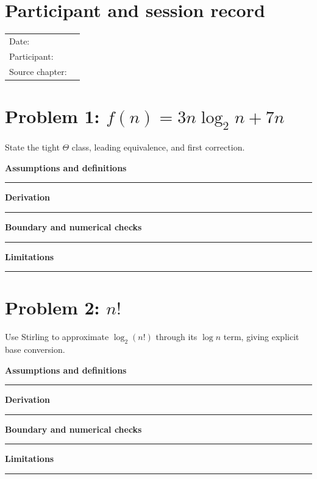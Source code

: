 \documentclass[11pt]{article}
\begin{document}
\makedoctitle
\section{Participant and session record}
\begin{tabularx}{\linewidth}{@{}lX@{}}Date: & \hrulefill\\ Participant: & \hrulefill\\ Source chapter: & \hrulefill\\\end{tabularx}
\section{\texorpdfstring{Problem 1: $f(n)=3n\log_2 n+7n$}{Problem 1: Order of 3n log base 2 of n plus 7n}}
State the tight $\Theta$ class, leading equivalence, and first correction.\par\medskip
\textbf{Assumptions and definitions}\par\vspace{0.7cm}\hrule\vspace{0.35cm}
\textbf{Derivation}\par\vspace{2.1cm}\hrule\vspace{0.3cm}
\textbf{Boundary and numerical checks}\par\vspace{1.1cm}\hrule\vspace{0.35cm}
\textbf{Limitations}\par\vspace{0.9cm}\hrule\vspace{0.35cm}
\section{\texorpdfstring{Problem 2: $n!$}{Problem 2: Factorial n}}
Use Stirling to approximate $\log_2(n!)$ through its $\log n$ term, giving explicit base conversion.\par\medskip
\textbf{Assumptions and definitions}\par\vspace{0.7cm}\hrule\vspace{0.35cm}
\textbf{Derivation}\par\vspace{2.1cm}\hrule\vspace{0.3cm}
\textbf{Boundary and numerical checks}\par\vspace{1.1cm}\hrule\vspace{0.35cm}
\textbf{Limitations}\par\vspace{0.9cm}\hrule\vspace{0.35cm}
\end{document}
